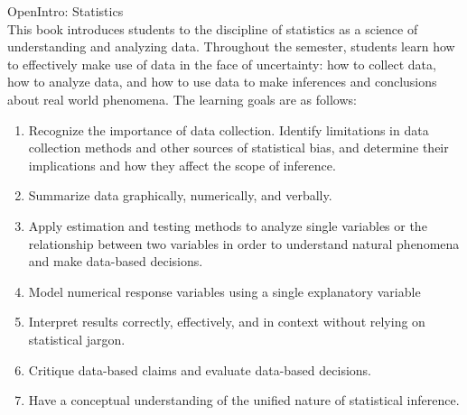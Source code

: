 \documentclass[11pt]{article}
\begin{document}
{\LARGE \textcolor{oiB}{OpenIntro: Statistics}} \\


This book introduces students to the discipline of statistics as a science of understanding and analyzing data. Throughout the semester, students learn how to effectively make use of data in the face of uncertainty: how to collect data, how to analyze data, and how to use data to make inferences and conclusions about real world phenomena. The learning goals are as follows:
 
\begin{enumerate}
\renewcommand\labelenumi{\textcolor{oiB}{\textbf{Goal \theenumi.}}}
\item Recognize the importance of data collection.  Identify limitations in data collection methods and other sources of statistical bias, and determine their implications and how they affect the scope of inference.
\item Summarize data graphically, numerically, and verbally.  
\item Apply estimation and testing methods to analyze single variables or the relationship between two variables in order to understand natural phenomena and make data-based decisions.
\item Model numerical response variables using a single explanatory variable 
\item Interpret results correctly, effectively, and in context without relying on statistical jargon.
\item Critique data-based claims and evaluate data-based decisions.
\item Have a conceptual understanding of the unified nature of statistical inference.
\end{enumerate}
\end{document}

